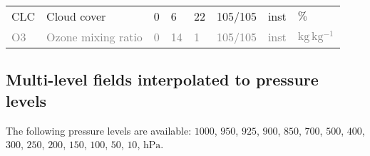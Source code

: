 \begin{table}[H]
\begin{tabular}{p{2.0cm}p{5.0cm}p{0.7cm}p{0.7cm}p{0.7cm}p{1.4cm}p{1cm}p{1cm}}
CLC                        &  Cloud cover                                                                               &               0                                   &                     6                       &                    22                      &                 105/105                         &                      inst                   &        $\mathrm{\%}$ \\
\textcolor{gray}{O3}       &  \textcolor{gray}{Ozone mixing ratio}\footnotemark[2]                                      &               \textcolor{gray}{0}                 &        \textcolor{gray}{14}                 &      \textcolor{gray}{1}                   &     \textcolor{gray}{105/105}                   &     \textcolor{gray}{inst}                  &        \textcolor{gray}{$\mathrm{kg\,kg^{-1}}$} \\                                             
  \bottomrule
 \end{tabular}
\end{table}



\subsection{Multi-level fields interpolated to pressure levels}

The following pressure levels are available: $1000$, $950$, $925$, $900$, $850$, $700$, $500$, $400$, $300$, $250$, $200$, $150$, $100$, $50$, $10$, $\mathrm{hPa}$.

